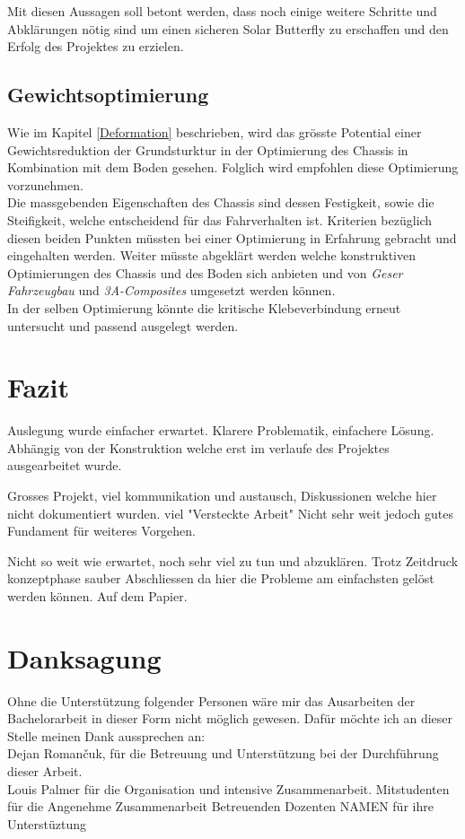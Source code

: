 Mit diesen Aussagen soll betont werden, dass noch einige weitere Schritte und Abklärungen nötig sind um einen sicheren Solar Butterfly zu erschaffen und den Erfolg des Projektes zu erzielen.


\subsection{Gewichtsoptimierung}
Wie im Kapitel \ref{Deformation} beschrieben, wird das grösste Potential einer Gewichtsreduktion der Grundsturktur in der Optimierung des Chassis in Kombination mit dem Boden gesehen. Folglich wird empfohlen diese Optimierung vorzunehmen.\\
Die massgebenden Eigenschaften des Chassis sind dessen Festigkeit, sowie die Steifigkeit, welche entscheidend für das Fahrverhalten ist. Kriterien bezüglich diesen beiden Punkten müssten bei einer Optimierung in Erfahrung gebracht und eingehalten werden. Weiter müsste abgeklärt werden welche konstruktiven Optimierungen des Chassis und des Boden sich anbieten und von \emph{Geser Fahrzeugbau} und \emph{3A-Composites} umgesetzt werden können.\\
In der selben Optimierung könnte die kritische Klebeverbindung erneut untersucht und passend ausgelegt werden.

\newpage

\section{Fazit}
Auslegung wurde einfacher erwartet. Klarere Problematik, einfachere Lösung.
Abhängig von der Konstruktion welche erst im verlaufe des Projektes ausgearbeitet wurde.

Grosses Projekt, viel kommunikation und austausch, Diskussionen welche hier nicht dokumentiert wurden. viel "Versteckte Arbeit"
Nicht sehr weit jedoch gutes Fundament für weiteres Vorgehen.

Nicht so weit wie erwartet, noch sehr viel zu tun und abzuklären.
Trotz Zeitdruck konzeptphase sauber Abschliessen da hier die Probleme am einfachsten gelöst werden können. Auf dem Papier.



\newpage

\section{Danksagung}
Ohne die Unterstützung folgender Personen wäre mir das Ausarbeiten der Bachelorarbeit in dieser Form nicht möglich gewesen. Dafür möchte ich an dieser Stelle meinen Dank aussprechen an:\\
Dejan Roman\v{c}uk, für die Betreuung und Unterstützung bei der Durchführung dieser Arbeit.\\
Louis Palmer für die Organisation und intensive Zusammenarbeit.
Mitstudenten für die Angenehme Zusammenarbeit
Betreuenden Dozenten NAMEN für ihre Unterstüztung
\newpage
